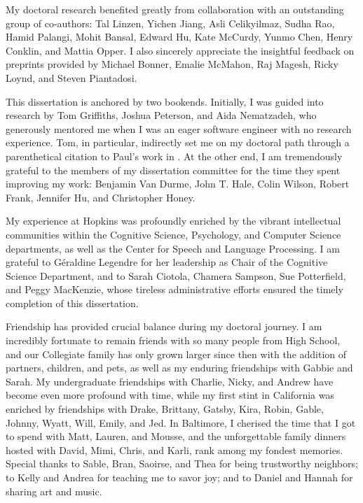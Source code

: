 My doctoral research benefited greatly from collaboration with an outstanding group of co-authors: Tal Linzen, Yichen Jiang, Asli Celikyilmaz, Sudha Rao, Hamid Palangi, Mohit Bansal, Edward Hu, Kate McCurdy, Yunmo Chen, Henry Conklin, and Mattia Opper. I also sincerely appreciate the insightful feedback on preprints provided by Michael Bonner, Emalie McMahon, Raj Magesh, Ricky Loynd, and Steven Piantadosi.

This dissertation is anchored by two bookends. Initially, I was guided into research by Tom Griffiths, Joshua Peterson, and Aida Nematzadeh, who generously mentored me when I was an eager software engineer with no research experience. Tom, in particular, indirectly set me on my doctoral path through a parenthetical citation to Paul’s work in \citet{griffiths_probabilistic_2010}. At the other end, I am tremendously grateful to the members of my dissertation committee for the time they spent improving my work: Benjamin Van Durme, John T. Hale, Colin Wilson, Robert Frank, Jennifer Hu, and Christopher Honey.

My experience at Hopkins was profoundly enriched by the vibrant intellectual communities within the Cognitive Science, Psychology, and Computer Science departments, as well as the Center for Speech and Language Processing. I am grateful to Géraldine Legendre for her leadership as Chair of the Cognitive Science Department, and to Sarah Ciotola, Chamera Sampson, Sue Potterfield, and Peggy MacKenzie, whose tireless administrative efforts ensured the timely completion of this dissertation.

Friendship has provided crucial balance during my doctoral journey. I am incredibly fortunate to remain friends with so many people from High School, and our Collegiate family has only grown larger since then with the addition of partners, children, and pets, as well as my enduring friendships with Gabbie and Sarah. My undergraduate friendships with Charlie, Nicky, and Andrew have become even more profound with time, while my first stint in California was enriched by friendships with Drake, Brittany, Gatsby, Kira, Robin, Gable, Johnny, Wyatt, Will, Emily, and Jed. In Baltimore, I cherised the time that I got to spend with Matt, Lauren, and Mousse, and the unforgettable family dinners hosted with David, Mimi, Chris, and Karli, rank among my fondest memories. Special thanks to Sable, Bran, Saoirse, and Thea for being trustworthy neighbors; to Kelly and Andrea for teaching me to savor joy; and to Daniel and Hannah for sharing art and music.

